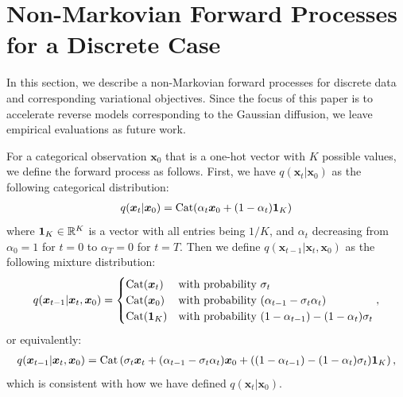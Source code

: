\newpage
\appendix

\section{Non-Markovian Forward Processes for a Discrete Case}
\label{app:discrete}
In this section, we describe a non-Markovian forward processes for discrete data and corresponding variational objectives. Since the focus of this paper is to accelerate reverse models corresponding to the Gaussian diffusion, we leave empirical evaluations as future work. 

For a categorical observation $\bm{x}_0$ that is a one-hot vector with $K$ possible values, we define the forward process as follows. First, we have $q(\bm{x}_t | \bm{x}_0)$ as the following categorical distribution:
\begin{align}
    q(\bm{x}_t | \bm{x}_0) = \mathrm{Cat}(\alpha_t \bm{x}_0 + (1 - \alpha_t) {\bm{1}}_K)
\end{align}
where ${\bm{1}}_K \in \mathbb{R}^{K}$ is a vector with all entries being $1/K$, and $\alpha_t$ decreasing from $\alpha_0 = 1$ for $t = 0$ to $\alpha_T = 0$ for $t = T$.
Then we define $q(\bm{x}_{t-1} | \bm{x}_t, \bm{x}_0)$ as the following mixture distribution:
\begin{align}
    q(\bm{x}_{t-1} | \bm{x}_t, \bm{x}_0) = \begin{cases}
    \mathrm{Cat}(\bm{x}_t) & \text{with probability } \sigma_t \\
    \mathrm{Cat}(\bm{x}_0) & \text{with probability } (\alpha_{t-1} - \sigma_t \alpha_t) \\
    \mathrm{Cat}({\bm{1}}_K) & \text{with probability } (1 - \alpha_{t-1}) - (1 - \alpha_t) \sigma_t
    \end{cases},
\end{align}
or equivalently:
\begin{align}
    q(\bm{x}_{t-1} | \bm{x}_t, \bm{x}_0) = \mathrm{Cat}\left(\sigma_t \bm{x}_t + (\alpha_{t-1} - \sigma_t \alpha_t) \bm{x}_0 + ((1 - \alpha_{t-1}) - (1 - \alpha_t) \sigma_t) {\bm{1}}_K\right),
\end{align}
which is consistent with how we have defined $q(\bm{x}_t | \bm{x}_0)$. 

